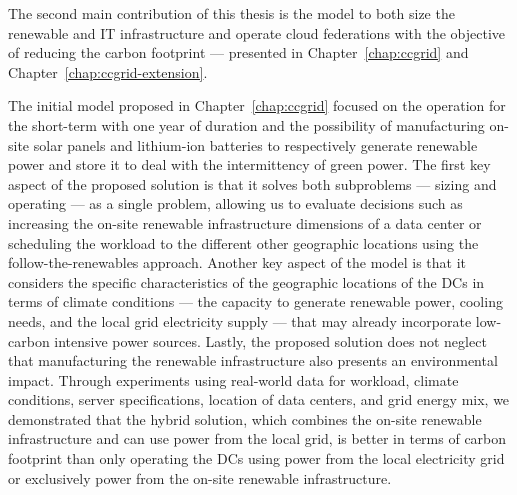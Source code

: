 The second main contribution of this thesis is the model to both size the renewable and IT infrastructure and operate cloud federations with the objective of reducing the carbon footprint --- presented in Chapter~\ref{chap:ccgrid} and Chapter~\ref{chap:ccgrid-extension}. 

The initial model proposed in Chapter~\ref{chap:ccgrid} focused on the operation for the short-term with one year of duration and the possibility of manufacturing on-site solar panels and lithium-ion batteries to respectively generate renewable power and store it to deal with the intermittency of green power. The first key aspect of the proposed solution is that it solves both subproblems --- sizing and operating --- as a single problem, allowing us to evaluate decisions such as increasing the on-site renewable infrastructure dimensions of a data center or scheduling the workload to the different other geographic locations using the follow-the-renewables approach. Another key aspect of the model is that it considers the specific characteristics of the geographic locations of the DCs in terms of climate conditions --- the capacity to generate renewable power, cooling needs, and the local grid electricity supply --- that may already incorporate low-carbon intensive power sources. Lastly, the proposed solution does not neglect that manufacturing the renewable infrastructure also presents an environmental impact. Through experiments using real-world data for workload, climate conditions, server specifications, location of data centers, and grid energy mix,  we demonstrated that the hybrid solution, which combines the on-site renewable infrastructure and can use power from the local grid, is better in terms of carbon footprint than only operating the DCs using power from the local electricity grid or exclusively power from the on-site renewable infrastructure.

